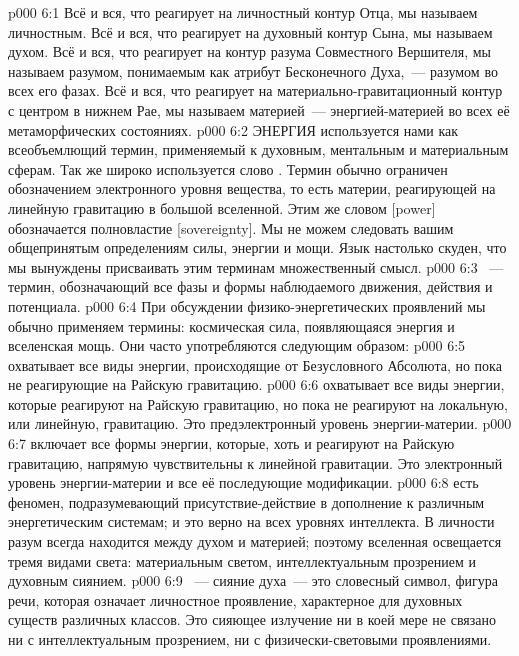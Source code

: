 \vs p000 6:1 Всё и вся, что реагирует на личностный контур Отца, мы называем личностным. Всё и вся, что реагирует на духовный контур Сына, мы называем духом. Всё и вся, что реагирует на контур разума Совместного Вершителя, мы называем разумом, понимаемым как атрибут Бесконечного Духа,~--- разумом во всех его фазах. Всё и вся, что реагирует на материально\hyp{}гравитационный контур с центром в нижнем Рае, мы называем материей~--- энергией\hyp{}материей во всех её метаморфических состояниях.
\vs p000 6:2 \pc ЭНЕРГИЯ используется нами как всеобъемлющий термин, применяемый к духовным, ментальным и материальным сферам. Так же широко используется слово . Термин  обычно ограничен обозначением электронного уровня вещества, то есть материи, реагирующей на линейную гравитацию в большой вселенной. Этим же словом [power] обозначается полновластие [sovereignty]. Мы не можем следовать вашим общепринятым определениям силы, энергии и мощи. Язык настолько скуден, что мы вынуждены присваивать этим терминам множественный смысл.
\vs p000 6:3 \pc {}~--- термин, обозначающий все фазы и формы наблюдаемого движения, действия и потенциала.
\vs p000 6:4 При обсуждении физико\hyp{}энергетических проявлений мы обычно применяем термины: космическая сила, появляющаяся энергия и вселенская мощь. Они часто употребляются следующим образом:
\vs p000 6:5  охватывает все виды энергии, происходящие от Безусловного Абсолюта, но пока не реагирующие на Райскую гравитацию.
\vs p000 6:6  охватывает все виды энергии, которые реагируют на Райскую гравитацию, но пока не реагируют на локальную, или линейную, гравитацию. Это предэлектронный уровень энергии\hyp{}материи.
\vs p000 6:7  включает все формы энергии, которые, хоть и реагируют на Райскую гравитацию, напрямую чувствительны к линейной гравитации. Это электронный уровень энергии\hyp{}материи и все её последующие модификации.
\vs p000 6:8 \pc {} есть феномен, подразумевающий присутствие\hyp{}действие  в дополнение к различным энергетическим системам; и это верно на всех уровнях интеллекта. В личности разум всегда находится между духом и материей; поэтому вселенная освещается тремя видами света: материальным светом, интеллектуальным прозрением и духовным сиянием.
\vs p000 6:9 \pc {}~--- сияние духа~--- это словесный символ, фигура речи, которая означает личностное проявление, характерное для духовных существ различных классов. Это сияющее излучение ни в коей мере не связано ни с интеллектуальным прозрением, ни с физически\hyp{}световыми проявлениями.
